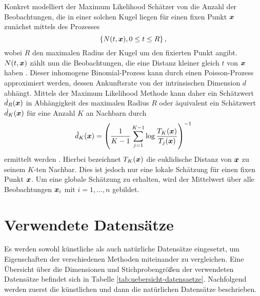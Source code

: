 Konkret modelliert der Maximum Likelihood Schätzer von \textcite{Levina.2004} die Anzahl der
Beobachtungen, die in einer solchen Kugel liegen für einen fixen Punkt $\bm{x}$ zunächst mittels
des Prozesses
\begin{equation}
	\{ N(t, \bm{x}), 0 \leq t \leq R \} \, ,
\end{equation}
wobei $R$ den maximalen Radius der Kugel um den fixierten Punkt angibt. $N(t, \bm{x})$ zählt nun die Beobachtungen, die eine Distanz kleiner gleich $t$ von $\bm{x}$ haben \parencite[3]{Levina.2004}. Dieser inhomogene Binomial-Prozess kann durch einen Poisson-Prozess
approximiert werden, dessen Ankunftsrate von der intrinsischen Dimension $d$ abhängt. Mittels der
Maximum Likelihood Methode kann daher ein Schätzwert $\hat{d}_R(\bm{x})$ in Abhängigkeit
des maximalen Radius $R$ oder äquivalent ein Schätzwert $\hat{d}_K(\bm{x})$ für eine Anzahl
$K$ an Nachbarn durch
\begin{equation}
	\hat{d}_K(\bm{x}) = \left( \frac{1}{K - 1} \sum_{j=1}^{K - 1} \log \frac{T_K(\bm{x})}{T_j(\bm{x})} \right)^{-1}
\end{equation}
ermittelt werden \parencite[3 -- 4]{Levina.2004}. Hierbei bezeichnet $T_{K}(\bm{x})$ die euklidische Distanz von
$\bm{x}$ zu seinem $K$-ten Nachbar. Dies ist jedoch nur eine lokale Schätzung für einen fixen
Punkt $\bm{x}$. Um eine globale Schätzung zu erhalten, wird der Mittelwert über alle
Beobachtungen $\bm{x}_i$ mit $i = 1, \ldots, n$ gebildet.
\section{Verwendete Datensätze}
\label{ch:Vergleich:sec:VerwendeteDatensaetze}
Es werden sowohl künstliche als auch natürliche Datensätze eingesetzt, um Eigenschaften der
verschiedenen Methoden miteinander zu vergleichen. Eine Übersicht über die Dimensionen und Stichprobengrößen der verwendeten Datensätze befindet sich in Tabelle \ref{tab:uebersicht-datensaetze}. Nachfolgend werden zuerst die künstlichen und dann die natürlichen Datensätze beschrieben.

